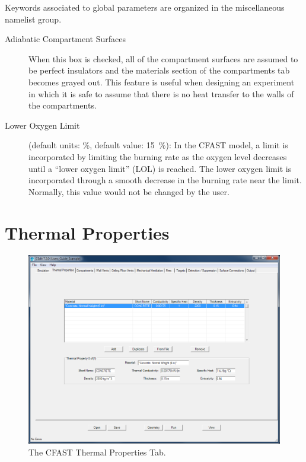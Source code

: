 Keywords associated to global parameters are organized in the miscellaneous namelist group.

\begin{description}
\item[Adiabatic Compartment Surfaces] When this box is checked, all of the compartment surfaces are assumed to be perfect insulators and the materials section of the compartments tab becomes grayed out. This feature is useful when designing an experiment in which it is safe to assume that there is no heat transfer to the walls of the compartments.

\item[Lower Oxygen Limit] (default units: \%, default value: 15~\%):  In the CFAST model, a limit is incorporated by limiting the burning rate as the oxygen level decreases until a ``lower oxygen limit'' (LOL) is reached. The lower oxygen limit is incorporated through a smooth decrease in the burning rate near the limit. Normally, this value would not be changed by the user.
\end{description}





\chapter{Thermal Properties}

\begin{figure}[ht]
\centering
\includegraphics[width=6.5in]{FIGURES/Thermal_Properties_Tab}
\caption[The CFAST Thermal Properties Tab]{The CFAST Thermal Properties Tab.}
\end{figure}

